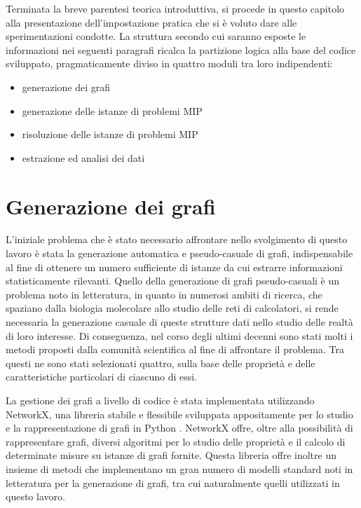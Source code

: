 {Terminata la breve parentesi teorica introduttiva,  si procede in questo capitolo alla presentazione
dell'impostazione pratica che si è voluto dare alle sperimentazioni condotte. La struttura secondo cui
saranno esposte le informazioni nei seguenti paragrafi ricalca la partizione logica alla base del codice
sviluppato, pragmaticamente diviso in quattro moduli tra loro indipendenti:}

\begin{itemize}
\item generazione dei grafi
\item generazione delle istanze di problemi MIP
\item risoluzione delle istanze di problemi MIP
\item estrazione ed analisi dei dati
\end{itemize}

\section{Generazione dei grafi}
L'iniziale problema che è stato necessario affrontare nello svolgimento di questo lavoro è stata la 
generazione automatica e pseudo-casuale di grafi, indispensabile al fine di ottenere un numero sufficiente di 
istanze da cui estrarre informazioni statisticamente rilevanti. Quello della generazione di grafi pseudo-casuali è un problema noto in letteratura, in quanto in numerosi ambiti di ricerca, che spaziano dalla biologia 
molecolare allo studio delle reti di calcolatori, si rende necessaria la generazione casuale di queste strutture 
dati nello studio delle realtà di loro interesse. 
Di conseguenza, nel corso degli ultimi decenni sono stati molti i metodi proposti dalla comunità scientifica al 
fine di affrontare il problema. Tra questi ne sono stati selezionati quattro, sulla base delle proprietà e delle caratteristiche particolari di ciascuno di essi.  

La gestione dei grafi a livello di codice è stata implementata utilizzando NetworkX, una libreria stabile e flessibile sviluppata appositamente per lo studio e la rappresentazione di grafi in Python \cite{networkx}. NetworkX offre, oltre alla possibilità di rappresentare grafi, diversi algoritmi per lo studio delle proprietà e il calcolo di determinate misure su istanze di grafi fornite. Questa libreria offre inoltre un insieme di metodi che implementano un gran numero di modelli standard noti in letteratura per la generazione di grafi, tra cui naturalmente quelli utilizzati in questo lavoro. 


